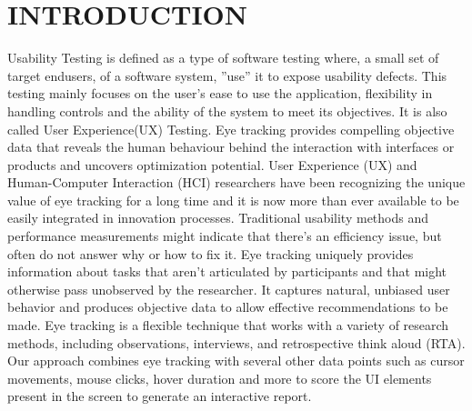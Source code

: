 \documentclass[12pt,a4paper,final]{extreport}
\begin{document}
\chapter{INTRODUCTION}
\vspace{0.3cm}
\noindent
Usability Testing is defined as a type of software testing where, a small set of target endusers,
of a software system, ”use” it to expose usability defects. This testing mainly focuses
on the user’s ease to use the application, flexibility in handling controls and the ability of the
system to meet its objectives. It is also called User Experience(UX) Testing.
Eye tracking provides compelling objective data that reveals the human behaviour behind
the interaction with interfaces or products and uncovers optimization potential. User Experience
(UX) and Human-Computer Interaction (HCI) researchers have been recognizing the
unique value of eye tracking for a long time and it is now more than ever available to be easily
integrated in innovation processes.
Traditional usability methods and performance measurements might indicate that there’s an
efficiency issue, but often do not answer why or how to fix it. Eye tracking uniquely provides
information about tasks that aren’t articulated by participants and that might otherwise pass unobserved
by the researcher. It captures natural, unbiased user behavior and produces objective
data to allow effective recommendations to be made. Eye tracking is a flexible technique that
works with a variety of research methods, including observations, interviews, and retrospective
think aloud (RTA).
Our approach combines eye tracking with several other data points such as cursor movements,
mouse clicks, hover duration and more to score the UI elements present in the screen to
generate an interactive report.


\vspace{0.5cm}
\newpage
\end{document}

